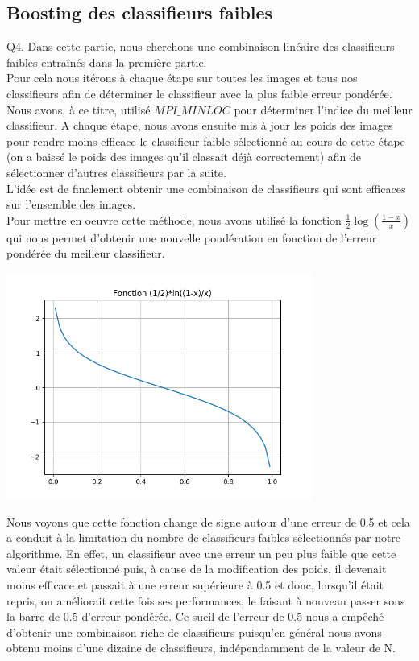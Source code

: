 \documentclass[a4paper,11pt]{article}
\begin{document}
\subsection{Boosting des classifieurs faibles}

Q4. Dans cette partie, nous cherchons une combinaison linéaire des classifieurs faibles entraînés dans la première partie.\\
Pour cela nous itérons à chaque étape sur toutes les images et tous nos classifieurs afin de déterminer le classifieur avec la plus faible erreur pondérée. Nous avons, à ce titre, utilisé $MPI\_MINLOC$ pour déterminer l’indice du meilleur classifieur. A chaque étape, nous avons ensuite mis à jour les poids des images pour rendre moins efficace le classifieur faible sélectionné au cours de cette étape (on a baissé le poids des images qu'il classait déjà correctement) afin de sélectionner d’autres classifieurs par la suite.\\
L’idée est de finalement obtenir une combinaison de classifieurs qui sont efficaces sur l’ensemble des images.\\

Pour mettre en oeuvre cette méthode, nous avons utilisé la fonction $\frac{1}{2}\log(\frac{1-x}{x})$ qui nous permet d'obtenir une nouvelle pondération en fonction de l’erreur pondérée du meilleur classifieur.\\

\begin{center}
\includegraphics[width=10cm]{"Fig5 alpha"}\\
\end{center}

Nous voyons que cette fonction change de signe autour d’une erreur de 0.5 et cela a conduit à la limitation du nombre de classifieurs faibles sélectionnés par notre algorithme. En effet, un classifieur avec une erreur un peu plus faible que cette valeur était sélectionné puis, à cause de la modification des poids, il devenait moins efficace et passait à une erreur supérieure à 0.5 et donc, lorsqu’il était repris, on améliorait cette fois ses performances, le faisant à nouveau passer sous la barre de 0.5 d’erreur pondérée. Ce sueil de l'erreur de 0.5 nous a empêché d’obtenir une combinaison riche de classifieurs puisqu’en général nous avons obtenu moins d’une dizaine de classifieurs, indépendamment de la valeur de N.\\
\end{document}
